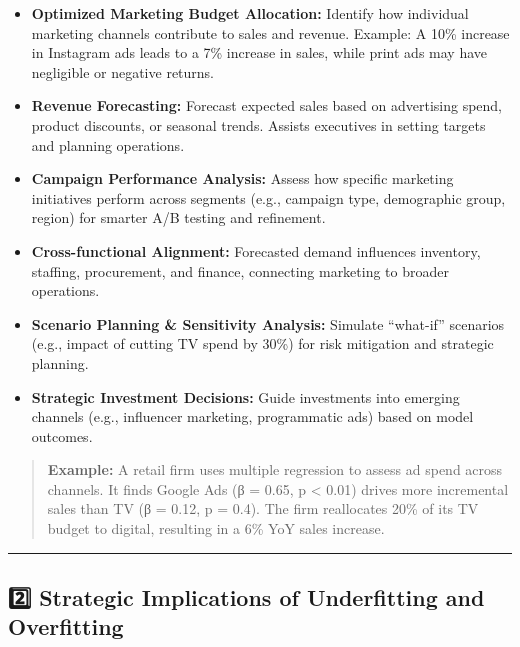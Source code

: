 \begin{itemize}
\tightlist
\item
  \textbf{Optimized Marketing Budget Allocation:} Identify how
  individual marketing channels contribute to sales and revenue.
  Example: A 10\% increase in Instagram ads leads to a 7\% increase in
  sales, while print ads may have negligible or negative returns.
\item
  \textbf{Revenue Forecasting:} Forecast expected sales based on
  advertising spend, product discounts, or seasonal trends. Assists
  executives in setting targets and planning operations.
\item
  \textbf{Campaign Performance Analysis:} Assess how specific marketing
  initiatives perform across segments (e.g., campaign type, demographic
  group, region) for smarter A/B testing and refinement.
\item
  \textbf{Cross-functional Alignment:} Forecasted demand influences
  inventory, staffing, procurement, and finance, connecting marketing to
  broader operations.
\item
  \textbf{Scenario Planning \& Sensitivity Analysis:} Simulate
  ``what-if'' scenarios (e.g., impact of cutting TV spend by 30\%) for
  risk mitigation and strategic planning.
\item
  \textbf{Strategic Investment Decisions:} Guide investments into
  emerging channels (e.g., influencer marketing, programmatic ads) based
  on model outcomes.
\end{itemize}

\begin{quote}
\textbf{Example:} A retail firm uses multiple regression to assess ad
spend across channels. It finds Google Ads (β = 0.65, p \textless{}
0.01) drives more incremental sales than TV (β = 0.12, p = 0.4). The
firm reallocates 20\% of its TV budget to digital, resulting in a 6\%
YoY sales increase.
\end{quote}

\begin{center}\rule{0.5\linewidth}{0.5pt}\end{center}

\subsection{2️⃣ Strategic Implications of Underfitting and
Overfitting}\label{strategic-implications-of-underfitting-and-overfitting}

\href{2_Underfitting_Overfitting.ipynb}{\pandocbounded{\texttt{[image: https://img.shields.io/badge/Notebook-Open\\\%20Underfitting\\\%20\\\%26\\\%20Overfitting\\\%20Notebook-blue?logo=jupyter]}}}

